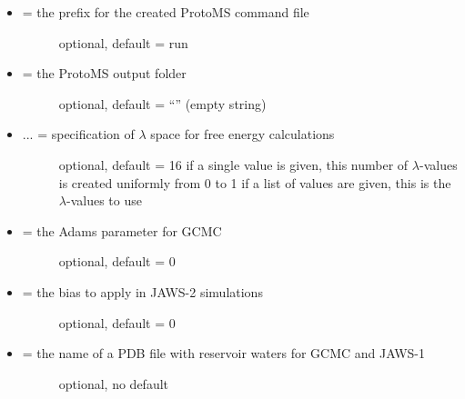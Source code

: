 \documentclass[letterpaper,10pt,english]{sphinxmanual}
\begin{document}
\begin{itemize}
\item {} \begin{description}
\item[{ = the prefix for the created ProtoMS command file}] \leavevmode
optional, default = run

\end{description}

\item {} \begin{description}
\item[{ = the ProtoMS output folder}] \leavevmode
optional, default = ``'' (empty string)

\end{description}

\item {} \begin{description}
\item[{ ... = specification of \(\lambda\) space for free energy calculations}] \leavevmode
optional, default = 16
if a single value is given, this number of \(\lambda\)-values is created uniformly from 0 to 1
if a list of values are given, this is the \(\lambda\)-values to use

\end{description}

\item {} \begin{description}
\item[{ = the Adams parameter for GCMC}] \leavevmode
optional, default = 0

\end{description}

\item {} \begin{description}
\item[{ = the bias to apply in JAWS-2 simulations}] \leavevmode
optional, default = 0

\end{description}

\item {} \begin{description}
\item[{ = the name of a PDB file with reservoir waters for GCMC and JAWS-1}] \leavevmode
optional, no default

\end{description}


\end{itemize}
\end{document}
